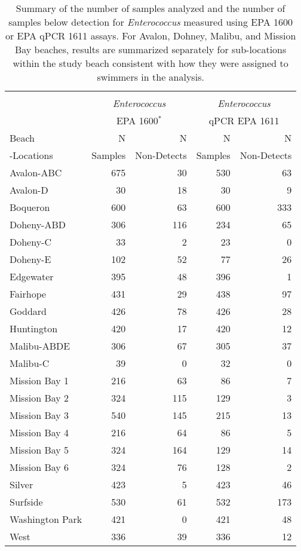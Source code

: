 \documentclass[12pt]{article}\usepackage[]{graphicx}\usepackage[]{color}
\begin{document}
\clearpage
\begin{table}[h!tb]
\begin{center}
\caption{Summary of the number of samples analyzed and the number of samples below detection for \textit{Enterococcus} measured using EPA 1600 or EPA qPCR 1611 assays.   For Avalon, Dohney, Malibu, and Mission Bay beaches, results are summarized separately for sub-locations within the study beach consistent with how they were assigned to swimmers in the analysis. \label{tab:wqsamplesum}}
\begin{tabular}{l rr rr}
 & \\
  & \multicolumn{2}{c}{\textit{Enterococcus}} & \multicolumn{2}{c}{\textit{Enterococcus}} \\
 & \multicolumn{2}{c}{EPA 1600$^*$}           & \multicolumn{2}{c}{qPCR EPA 1611} \\
Beach      & N       & N           & N       & N            \\
-Locations & Samples & Non-Detects & Samples & Non-Detects   \\
\hline
 Avalon-ABC & 675 & 30 & 530 & 63 \\ 
  Avalon-D & 30 & 18 & 30 & 9 \\ 
  Boqueron & 600 & 63 & 600 & 333 \\ 
  Doheny-ABD & 306 & 116 & 234 & 65 \\ 
  Doheny-C & 33 & 2 & 23 & 0 \\ 
  Doheny-E & 102 & 52 & 77 & 26 \\ 
  Edgewater & 395 & 48 & 396 & 1 \\ 
  Fairhope & 431 & 29 & 438 & 97 \\ 
  Goddard & 426 & 78 & 426 & 28 \\ 
  Huntington & 420 & 17 & 420 & 12 \\ 
  Malibu-ABDE & 306 & 67 & 305 & 37 \\ 
  Malibu-C & 39 & 0 & 32 & 0 \\ 
  Mission Bay 1 & 216 & 63 & 86 & 7 \\ 
  Mission Bay 2 & 324 & 115 & 129 & 3 \\ 
  Mission Bay 3 & 540 & 145 & 215 & 13 \\ 
  Mission Bay 4 & 216 & 64 & 86 & 5 \\ 
  Mission Bay 5 & 324 & 164 & 129 & 14 \\ 
  Mission Bay 6 & 324 & 76 & 128 & 2 \\ 
  Silver & 423 & 5 & 423 & 46 \\ 
  Surfside & 530 & 61 & 532 & 173 \\ 
  Washington Park & 421 & 0 & 421 & 48 \\ 
  West & 336 & 39 & 336 & 12 \\ 
  

\end{tabular}
\end{center}
\end{table}
\end{document}
